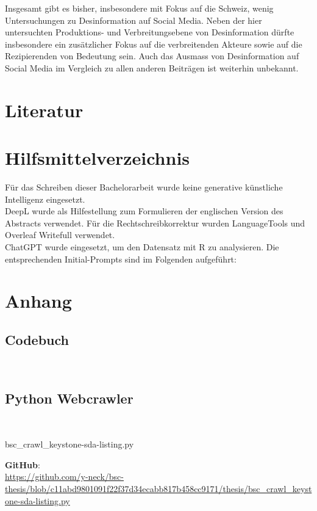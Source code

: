 \documentclass[12pt,a4paper]{article}        %
\begin{document}
\pagebreak
Insgesamt gibt es bisher, insbesondere mit Fokus auf die Schweiz, wenig Untersuchungen zu Desinformation auf Social Media. Neben der hier untersuchten Produktions- und Verbreitungsebene von Desinformation dürfte insbesondere ein zusätzlicher Fokus auf die verbreitenden Akteure sowie auf die Rezipierenden von Bedeutung sein. Auch das Ausmass von Desinformation auf Social Media im Vergleich zu allen anderen Beiträgen ist weiterhin unbekannt.

\pagebreak
\section{Literatur}
\printbibliography[heading=none, nottype=artwork]
\pagebreak
\section{Hilfsmittelverzeichnis}
Für das Schreiben dieser Bachelorarbeit wurde keine generative künstliche Intelligenz eingesetzt. \\
DeepL wurde als Hilfestellung zum Formulieren der englischen Version des Abstracts verwendet. Für die Rechtschreibkorrektur wurden LanguageTools und Overleaf Writefull verwendet.\\
ChatGPT wurde eingesetzt, um den Datensatz mit R zu analysieren. Die entsprechenden Initial-Prompts sind im Folgenden aufgeführt:

\pagebreak
\section{Anhang}
\subsection{Codebuch}
~\label{appendix_codebook}

\subsection{Python Webcrawler}
~\label{appendix_crawler}
\begin{lstinputlisting}[language=Python, caption=Python Webcrawler für Keystone-SDA]{bsc_crawl_keystone-sda-listing.py}
\end{lstinputlisting}
\begin{tcolorbox}[
    width=\textwidth,    %
    boxrule=1pt,         %
    arc=0pt,             %
    colback=white,       %
    left=6pt, right=6pt, top=6pt, bottom=6pt
  ]
  \textbf{GitHub}:\\
  \url{https://github.com/y-neck/bsc-thesis/blob/c11abd9801091f22f37d34ecabb817b458cc9171/thesis/bsc_crawl_keystone-sda-listing.py}
\end{tcolorbox}
\end{document}
